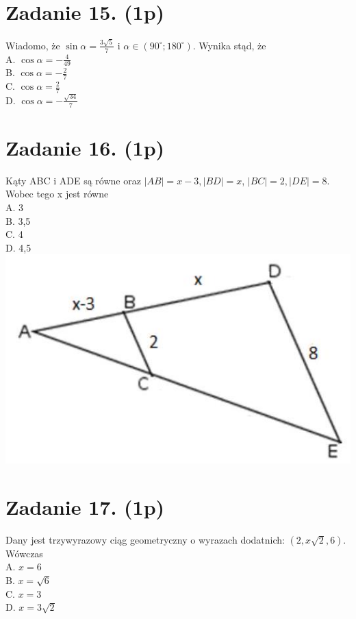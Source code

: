 \documentclass[10pt]{article}
\begin{document}
\section*{Zadanie 15. (1p)}
Wiadomo, że \(\sin \alpha=\frac{3 \sqrt{5}}{7}\) i \(\alpha \in\left(90^{\circ} ; 180^{\circ}\right)\). Wynika stąd, że\\
A. \(\cos \alpha=-\frac{4}{49}\)\\
B. \(\cos \alpha=-\frac{2}{7}\)\\
C. \(\cos \alpha=\frac{2}{7}\)\\
D. \(\cos \alpha=-\frac{\sqrt{34}}{7}\)

\section*{Zadanie 16. (1p)}
Kąty ABC i ADE są równe oraz \(|A B|=x-3,|B D|=x\), \(|B C|=2,|D E|=8\). Wobec tego x jest równe\\
A. 3\\
B. 3,5\\
C. 4\\
D. 4,5\\
\includegraphics[max width=\textwidth, center]{2024_11_21_b63ac6eb3d78a57ac924g-06}

\section*{Zadanie 17. (1p)}
Dany jest trzywyrazowy ciąg geometryczny o wyrazach dodatnich: \((2, x \sqrt{2}, 6)\). Wówczas\\
A. \(x=6\)\\
B. \(x=\sqrt{6}\)\\
C. \(x=3\)\\
D. \(x=3 \sqrt{2}\)
\end{document}
